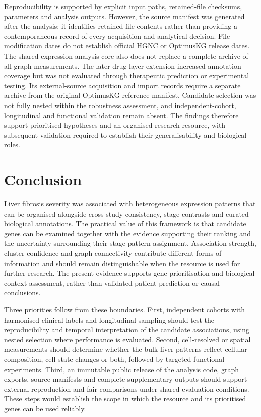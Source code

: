 \documentclass[11pt,a4paper]{article}
\begin{document}
Reproducibility is supported by explicit input paths, retained-file checksums, parameters and analysis outputs. However, the source manifest was generated after the analysis; it identifies retained file contents rather than providing a contemporaneous record of every acquisition and analytical decision. File modification dates do not establish official HGNC or OptimusKG release dates. The shared expression-analysis core also does not replace a complete archive of all graph measurements. The later drug-layer extension increased annotation coverage but was not evaluated through therapeutic prediction or experimental testing. Its external-source acquisition and import records require a separate archive from the original OptimusKG reference manifest. Candidate selection was not fully nested within the robustness assessment, and independent-cohort, longitudinal and functional validation remain absent. The findings therefore support prioritised hypotheses and an organised research resource, with subsequent validation required to establish their generalisability and biological roles.

\section*{Conclusion}
Liver fibrosis severity was associated with heterogeneous expression patterns that can be organised alongside cross-study consistency, stage contrasts and curated biological annotations. The practical value of this framework is that candidate genes can be examined together with the evidence supporting their ranking and the uncertainty surrounding their stage-pattern assignment. Association strength, cluster confidence and graph connectivity contribute different forms of information and should remain distinguishable when the resource is used for further research. The present evidence supports gene prioritisation and biological-context assessment, rather than validated patient prediction or causal conclusions.

Three priorities follow from these boundaries. First, independent cohorts with harmonised clinical labels and longitudinal sampling should test the reproducibility and temporal interpretation of the candidate associations, using nested selection where performance is evaluated. Second, cell-resolved or spatial measurements should determine whether the bulk-liver patterns reflect cellular composition, cell-state changes or both, followed by targeted functional experiments. Third, an immutable public release of the analysis code, graph exports, source manifests and complete supplementary outputs should support external reproduction and fair comparisons under shared evaluation conditions. These steps would establish the scope in which the resource and its prioritised genes can be used reliably.
\end{document}
